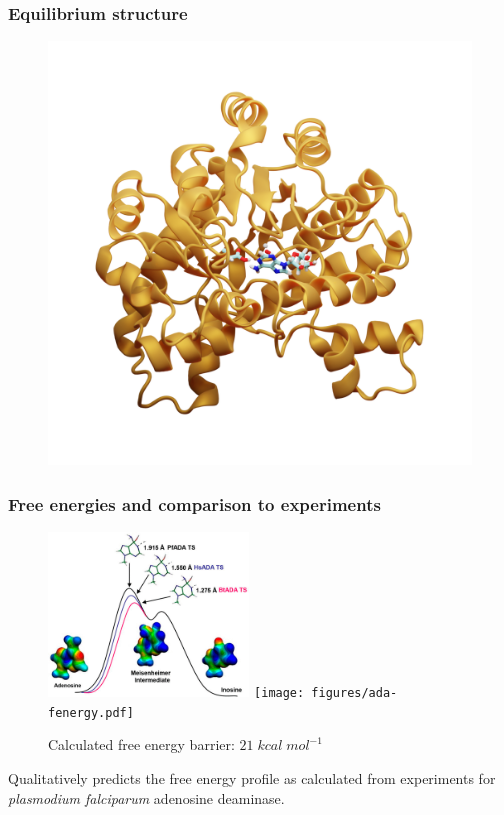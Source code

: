 \documentclass{beamer}
\begin{document}
\begin{frame}
\frametitle{Equilibrium structure}
\begin{figure}
\includegraphics[scale=0.23]{figures/ada-equil.png}
\end{figure}
\end{frame}
\begin{frame}
\frametitle{Free energies and comparison to experiments}
\begin{figure}
   \includegraphics[width=0.475\textwidth]{figures/ada-exp.png}
   \hfill
   \texttt{[image: figures/ada-fenergy.pdf]}
\caption{Calculated free energy barrier: $21\;kcal\;mol^{-1}$}
\end{figure}
Qualitatively predicts the free energy profile as calculated from experiments for \textit{plasmodium falciparum}
adenosine deaminase.
\end{frame}
\end{document}

